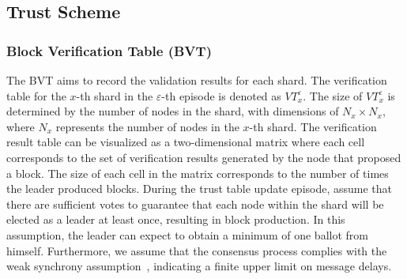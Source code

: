 



\subsection{Trust Scheme}
\subsubsection{Block Verification Table (BVT) }
The BVT aims to record the validation results for each shard. The verification table for the $x$-th shard in the $\varepsilon$-th episode is denoted as $VT_x^\varepsilon$. The size of $VT_x^\varepsilon$ is determined by the number of nodes in the shard, with dimensions of $N_x \times N_x$, where $N_x$ represents the number of nodes in the $x$-th shard. The verification result table can be visualized as a two-dimensional matrix where each cell corresponds to the set of verification results generated by the node that proposed a block. The size of each cell in the matrix corresponds to the number of times the leader produced blocks. During the trust table update episode, assume that there are sufficient votes to guarantee that each node within the shard will be elected as a leader at least once, resulting in block production. In this assumption, the leader can expect to obtain a minimum of one ballot from himself. Furthermore, we assume that the consensus process complies with the weak synchrony assumption~\cite{castro1999practical}, indicating a finite upper limit on message delays.


